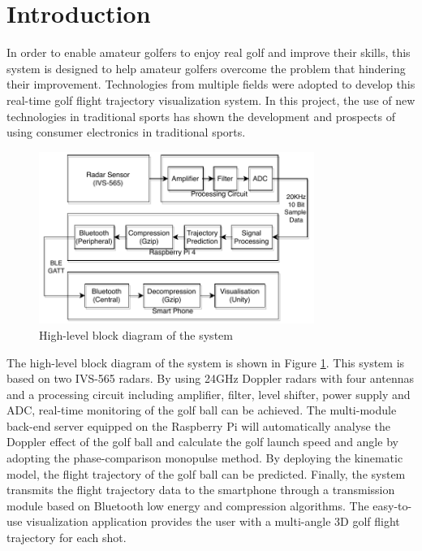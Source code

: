\thispagestyle{empty}
\newpage

\tableofcontents{\protect\thispagestyle{empty}}
\pagestyle{fancy}
\clearpage
\setcounter{page}{1}
\newpage



\section{Introduction}
In order to enable amateur golfers to enjoy real golf and improve their skills, this system is designed to help amateur golfers overcome the problem that hindering their improvement.
Technologies from multiple fields were adopted to develop this real-time golf flight trajectory visualization system. In this project, the use of new technologies in traditional sports has shown the development and prospects of using consumer electronics in traditional sports.

\begin{figure}[H]
    \centering
    \includegraphics[width=0.8\textwidth]{figure/BlockDiagram_bw.pdf}
    \caption{High-level block diagram of the system}
     \label{fig:block}
\end{figure}

The high-level block diagram of the system is shown in Figure \ref{fig:block}. This system is based on two IVS-565 radars. By using 24GHz Doppler radars with four antennas and a processing circuit including amplifier, filter, level shifter, power supply and ADC, real-time monitoring of the golf ball can be achieved. The multi-module back-end server equipped on the Raspberry Pi will automatically analyse the Doppler effect of the golf ball and calculate the golf launch speed and angle by adopting the phase-comparison monopulse method.
By deploying the kinematic model, the flight trajectory of the golf ball can be predicted. Finally, the system transmits the flight trajectory data to the smartphone through a transmission module based on Bluetooth low energy and compression algorithms. The easy-to-use visualization application provides the user with a multi-angle 3D golf flight trajectory for each shot.


